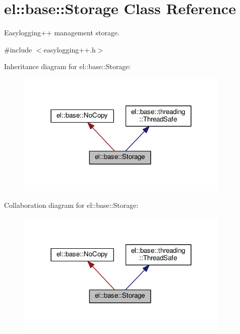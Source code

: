 \hypertarget{classel_1_1base_1_1_storage}{}\section{el\+:\+:base\+:\+:Storage Class Reference}
\label{classel_1_1base_1_1_storage}


Easylogging++ management storage.  




{\ttfamily \#include $<$easylogging++.\+h$>$}



Inheritance diagram for el\+:\+:base\+:\+:Storage\+:
\nopagebreak
\begin{figure}[H]
\begin{center}
\leavevmode
\includegraphics[width=288pt]{classel_1_1base_1_1_storage__inherit__graph}
\end{center}
\end{figure}


Collaboration diagram for el\+:\+:base\+:\+:Storage\+:
\nopagebreak
\begin{figure}[H]
\begin{center}
\leavevmode
\includegraphics[width=288pt]{classel_1_1base_1_1_storage__coll__graph}
\end{center}
\end{figure}
